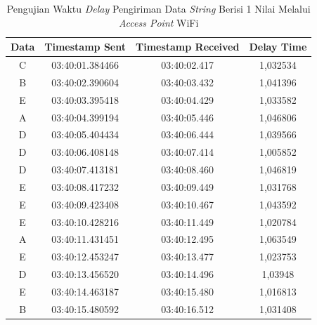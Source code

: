 \begin{table}[htpb]
\centering
  \caption{Pengujian Waktu \emph{Delay} Pengiriman Data \emph{String} Berisi 1 Nilai Melalui \emph{Access Point} WiFi}
  \label{tbl:delayWiFi1}
  \begin{tabular}{|ccc|c|}
  \hline
  \multicolumn{1}{|c|}{Data} & \multicolumn{1}{c|}{Timestamp Sent}  & Timestamp Received & Delay Time \\ \hline
  \multicolumn{1}{|c|}{C}    & \multicolumn{1}{c|}{03:40:01.384466} & 03:40:02.417       & 1,032534   \\ \hline
  \multicolumn{1}{|c|}{B}    & \multicolumn{1}{c|}{03:40:02.390604} & 03:40:03.432       & 1,041396   \\ \hline
  \multicolumn{1}{|c|}{E}    & \multicolumn{1}{c|}{03:40:03.395418} & 03:40:04.429       & 1,033582   \\ \hline
  \multicolumn{1}{|c|}{A}    & \multicolumn{1}{c|}{03:40:04.399194} & 03:40:05.446       & 1,046806   \\ \hline
  \multicolumn{1}{|c|}{D}    & \multicolumn{1}{c|}{03:40:05.404434} & 03:40:06.444       & 1,039566   \\ \hline
  \multicolumn{1}{|c|}{D}    & \multicolumn{1}{c|}{03:40:06.408148} & 03:40:07.414       & 1,005852   \\ \hline
  \multicolumn{1}{|c|}{D}    & \multicolumn{1}{c|}{03:40:07.413181} & 03:40:08.460       & 1,046819   \\ \hline
  \multicolumn{1}{|c|}{E}    & \multicolumn{1}{c|}{03:40:08.417232} & 03:40:09.449       & 1,031768   \\ \hline
  \multicolumn{1}{|c|}{E}    & \multicolumn{1}{c|}{03:40:09.423408} & 03:40:10.467       & 1,043592   \\ \hline
  \multicolumn{1}{|c|}{E}    & \multicolumn{1}{c|}{03:40:10.428216} & 03:40:11.449       & 1,020784   \\ \hline
  \multicolumn{1}{|c|}{A}    & \multicolumn{1}{c|}{03:40:11.431451} & 03:40:12.495       & 1,063549   \\ \hline
  \multicolumn{1}{|c|}{E}    & \multicolumn{1}{c|}{03:40:12.453247} & 03:40:13.477       & 1,023753   \\ \hline
  \multicolumn{1}{|c|}{D}    & \multicolumn{1}{c|}{03:40:13.456520} & 03:40:14.496       & 1,03948    \\ \hline
  \multicolumn{1}{|c|}{E}    & \multicolumn{1}{c|}{03:40:14.463187} & 03:40:15.480       & 1,016813   \\ \hline
  \multicolumn{1}{|c|}{B}    & \multicolumn{1}{c|}{03:40:15.480592} & 03:40:16.512       & 1,031408   \\ \hline

\end{tabular}
\end{table}
